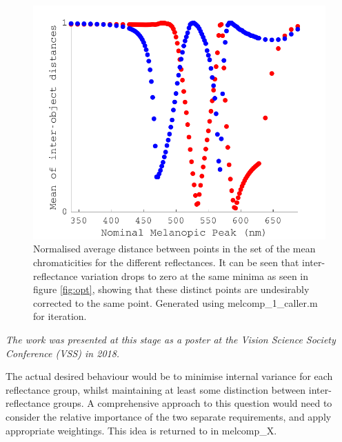 \begin{figure}[htbp]
    \includegraphics[max width=\textwidth]{figs/comp/melcomp_1_caller/sdmeans.pdf}
    \caption{Normalised average distance between points in the set of the mean chromaticities for the different reflectances. It can be seen that inter-reflectance variation drops to zero at the same minima as seen in figure \ref{fig:opt}, showing that these distinct points are undesirably corrected to the same point. Generated using melcomp\_1\_caller.m for iteration.}
    \label{fig:sdmeans}
\end{figure} 

\textit{The work was presented at this stage as a poster at the \emph{Vision Science Society Conference (VSS)} in 2018.}

The actual desired behaviour would be to minimise internal variance for each reflectance group, whilst maintaining at least some distinction between inter-reflectance groups. A comprehensive approach to this question would need to consider the relative importance of the two separate requirements, and apply appropriate weightings. This idea is returned to in melcomp\_X. %

